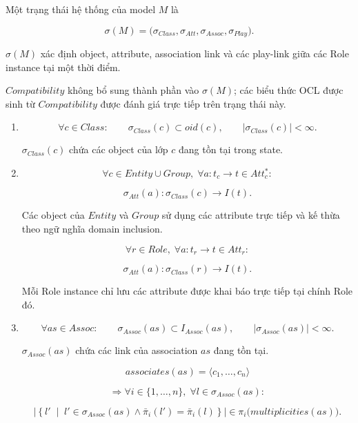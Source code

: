 \documentclass[12pt,a4paper]{article}
\theoremstyle{definition}
\begin{document}
Một trạng thái hệ thống của model $M$ là

\[
\sigma(M)
=
\bigl(
\sigma_{Class},
\sigma_{Att},
\sigma_{Assoc},
\sigma_{Play}
\bigr).
\]

$\sigma(M)$ xác định object, attribute, association link và các
play-link giữa các Role instance tại một thời điểm.

$Compatibility$ không bổ sung thành phần vào $\sigma(M)$; các biểu thức
OCL được sinh từ $Compatibility$ được đánh giá trực tiếp trên trạng thái này.

\begin{enumerate}
\renewcommand{\labelenumi}{(\roman{enumi})}

\item

\[
\forall c\in Class:
\qquad
\sigma_{Class}(c)\subset oid(c),
\qquad
|\sigma_{Class}(c)|<\infty.
\]

$\sigma_{Class}(c)$ chứa các object của lớp $c$ đang tồn tại trong state.


\item

\[
\forall c\in Entity\cup Group,\;
\forall a:t_c\to t\in Att_c^{*}:
\]

\[
\sigma_{Att}(a):
\sigma_{Class}(c)\to I(t).
\]

Các object của $Entity$ và $Group$ sử dụng các attribute trực tiếp
và kế thừa theo ngữ nghĩa domain inclusion.

\[
\forall r\in Role,\;
\forall a:t_r\to t\in Att_r:
\]

\[
\sigma_{Att}(a):
\sigma_{Class}(r)\to I(t).
\]

Mỗi Role instance chỉ lưu các attribute được khai báo trực tiếp
tại chính Role đó.


\item

\[
\forall as\in Assoc:
\qquad
\sigma_{Assoc}(as)
\subset
I_{Assoc}(as),
\qquad
|\sigma_{Assoc}(as)|<\infty.
\]

$\sigma_{Assoc}(as)$ chứa các link của association $as$ đang tồn tại.

\[
associates(as)=\langle c_1,\ldots,c_n\rangle
\]

\[
\Longrightarrow
\forall i\in\{1,\ldots,n\},\;
\forall l\in\sigma_{Assoc}(as):
\]

\[
\left|
\left\{
l'
\;\middle|\;
l'\in\sigma_{Assoc}(as)
\land
\bar{\pi}_i(l')
=
\bar{\pi}_i(l)
\right\}
\right|
\in
\pi_i\bigl(multiplicities(as)\bigr).
\]


\end{enumerate}
\end{document}
